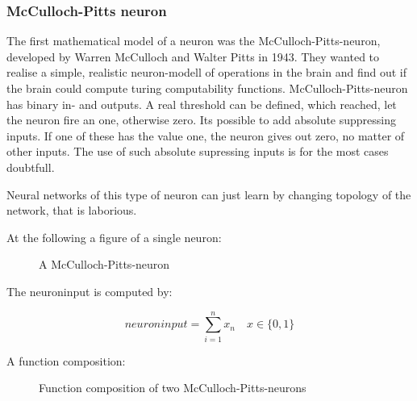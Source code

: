 \documentclass[10pt,a4paper,DIV=11]{scrreprt}
\begin{document}
\subsubsection{McCulloch-Pitts neuron}
The first mathematical model of a neuron was the McCulloch-Pitts-neuron,
developed by Warren McCulloch and Walter Pitts in 1943.
They wanted to realise a simple, realistic neuron-modell of operations in the brain and find out if the brain could compute turing computability functions.
McCulloch-Pitts-neuron has binary in- and outputs.
A real threshold can be defined, which reached, let the neuron fire an one, otherwise zero.
Its possible to add absolute suppressing inputs. If one of these has the value one, the neuron gives out zero, no matter of other inputs. The use of such absolute supressing inputs is for the most cases doubtfull.


Neural networks of this type of neuron can just learn by changing topology of the network, that is laborious.

At the following a figure of a single neuron:

\begin{figure}[H]  %
	\centering
	\caption{A McCulloch-Pitts-neuron}
	\label{fig:pitts1}
\end{figure}
The neuroninput is computed by:

\begin{equation}
	neuroninput = \sum_{i=1}^{n} x_{n} \quad  x \in \{0, 1\}
\end{equation}


A function composition:

\begin{figure}[H]
	\centering
	\caption{Function composition of two McCulloch-Pitts-neurons}
	\label{fig:pitts2}
\end{figure}
\end{document}
